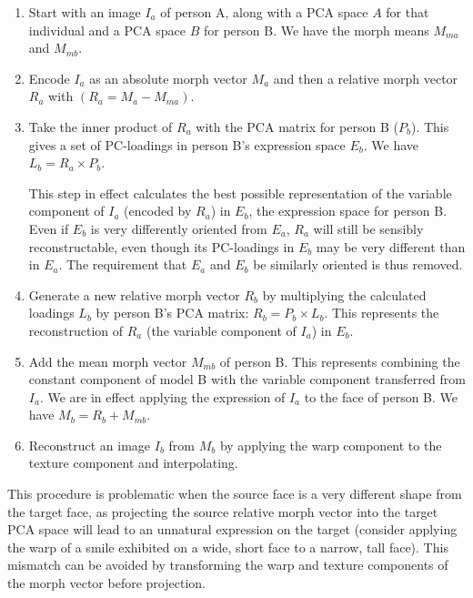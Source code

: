 \documentclass[runningheads]{llncs}
\begin{document}
\begin{enumerate}


\item	Start with an image $I_a$ of person A, along with a PCA space $A$ for that individual and a PCA space $B$ for person B. We have the morph means $M_{ma}$ and $M_{mb}$.

\item	Encode $I_a$ as an absolute morph vector $M_a$ and then a relative morph vector $R_a$ with $ (R_a = M_a - M_{ma})$.
\item	Take the inner product of $R_a$ with the PCA matrix for person B ($P_b$). This gives a set of PC-loadings in person B's expression space $E_b$. We have
$L_b = R_a \times P_b$.


This step in effect calculates the best possible representation of the variable component of $I_a$ (encoded by $R_a$) in $E_b$, the expression space for person B. Even if $E_b$ is very differently oriented from $E_a$, $R_a$ will still be sensibly reconstructable, even though its PC-loadings in $E_b$ may be very different than in $E_a$. The requirement that $E_a$ and $E_b$ be similarly oriented is thus removed.
\item	Generate a new relative morph vector $R_b$ by multiplying the calculated loadings $L_b$ by person B's PCA matrix:
$R_b = P_b \times L_b$.
This represents the reconstruction of $R_a$ (the variable component of $I_a$) in $E_b$.
\item	Add the mean morph vector $M_{mb}$ of person B. This represents combining the constant component of model B with the variable component transferred from $I_a$. We are in effect applying the expression of $I_a$ to the face of person B. We have $M_b = R_b + M_{mb}$.
\item	Reconstruct an image $I_b$ from $M_b$ by applying the warp component to the texture component and interpolating.


\end{enumerate}

This procedure is problematic when the source face is a very different shape from the target face, as projecting the source relative morph vector into the target PCA space will lead to an unnatural expression on the target (consider applying the warp of a smile exhibited on a wide, short face to a narrow, tall face). This mismatch can be avoided by transforming the warp and texture components of the morph vector before projection.
\end{document}
